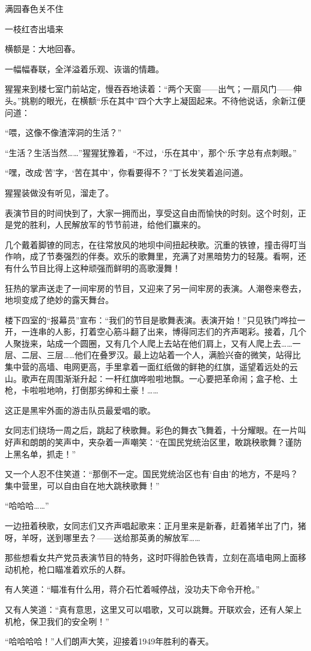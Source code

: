 \documentclass[12pt,UTF-8,openany]{ctexbook}
\begin{document}
\begin{large}
    满园春色关不住
    
    一枝红杏出墙来
    
    横额是：大地回春。
    
    一幅幅春联，全洋溢着乐观、诙谐的情趣。
    
    猩猩来到楼七室门前站定，慢吞吞地读着：“两个天窗——出气；一扇风门——伸头。”挑剔的眼光，在横额“乐在其中”四个大字上凝固起来。不待他说话，余新江便问道：
    
    “喂，这像不像渣滓洞的生活？”
    
    “生活？生活当然……”猩猩犹豫着，“不过，‘乐在其中’，那个‘乐’字总有点刺眼。”
    
    “嘿，改成‘苦’字，‘苦在其中’，你看要得不？”丁长发笑着追问道。
    
    猩猩装做没有听见，溜走了。
    
    表演节目的时间快到了，大家一拥而出，享受这自由而愉快的时刻。这个时刻，正是党的胜利，人民解放军的节节前进，给他们赢来的。
    
    几个戴着脚镣的同志，在往常放风的地坝中间扭起秧歌。沉重的铁镣，撞击得叮当作响，成了节奏强烈的伴奏。欢乐的歌舞里，充满了对黑暗势力的轻蔑。看啊，还有什么节目比得上这种顽强而鲜明的高歌漫舞！
    
    狂热的掌声送走了一间牢房的节目，又迎来了另一间牢房的表演。人潮卷来卷去，地坝变成了绝妙的露天舞台。
    
    楼下四室的“报幕员”宣布：“我们的节目是歌舞表演。表演开始！”只见铁门哗拉一开，一连串的人影，打着空心筋斗翻了出来，博得同志们的齐声喝彩。接着，几个人聚拢来，站成一个圆圈，又有几个人爬上去站在他们肩上，又有人爬上去……一层、二层、三层……他们在叠罗汉。最上边站着一个人，满脸兴奋的微笑，站得比集中营的高墙、电网更高，手里拿着一面红纸做的鲜艳的红旗，遥望着远处的云山。歌声在周围渐渐升起：一杆红旗哗啦啦地飘。一心要把革命闹；盒子枪、土枪，卡啦啦地响，打倒那劣绅和土豪！……
    
    这正是黑牢外面的游击队员最爱唱的歌。
    
    女同志们绕场一周之后，跳起了秧歌舞。彩色的舞衣飞舞着，十分耀眼。在一片叫好声和朗朗的笑声中，夹杂着一声嘲笑：“在国民党统治区里，敢跳秧歌舞？谨防上黑名单，抓走！”
    
    又一个人忍不住笑道：“那倒不一定。国民党统治区也有‘自由’的地方，不是吗？集中营里，可以自由自在地大跳秧歌舞！”
    
    “哈哈哈……”
    
    一边扭着秧歌，女同志们又齐声唱起歌来：正月里来是新春，赶着猪羊出了门，猪呀，羊呀，送到哪里去？——送给那英勇的解放军……
    
    那些想看女共产党员表演节目的特务，这时吓得脸色铁青，立刻在高墙电网上面移动机枪，枪口瞄准着欢乐的人群。
    
    有人笑道：“瞄准有什么用，蒋介石忙着喊停战，没功夫下命令开枪。”
    
    又有人笑道：“真有意思，这里又可以唱歌，又可以跳舞。开联欢会，还有人架上机枪，保卫我们的安全咧！”
    
    “哈哈哈哈！”人们朗声大笑，迎接着1949年胜利的春天。
    
\end{large}
\end{document}
